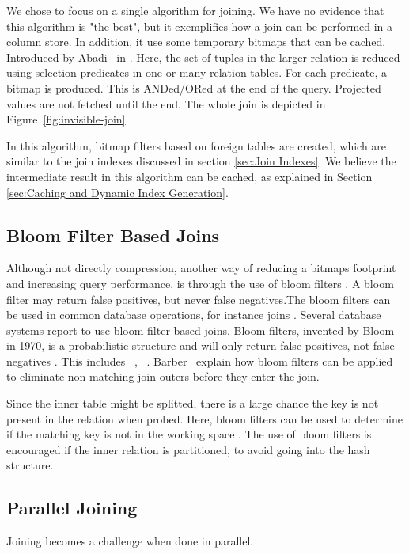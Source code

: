 We chose to focus on a single algorithm for joining. We have no evidence that this algorithm is "the best", but it exemplifies how a join can be performed in a column store. In addition, it use some temporary bitmaps that can be cached. Introduced by Abadi \ea~in  \cite{Abadi2008-dd}. Here, the set of tuples in the larger relation is reduced using selection predicates in one or many relation tables. For each predicate, a bitmap is produced. This is ANDed/ORed at the end of the query. Projected values are not fetched until the end. The whole join is depicted in Figure~\ref{fig:invisible-join}.

In this algorithm, bitmap filters based on foreign tables are created, which are similar to the join indexes discussed in section \ref{sec:Join Indexes}. We believe the intermediate result in this algorithm can be cached, as explained in Section \ref{sec:Caching and Dynamic Index Generation}.

\subsection{Bloom Filter Based Joins}
\label{sub:Bloom Filter Based Joins}
Although not directly compression, another way of reducing a bitmaps footprint and increasing query performance, is through the use of bloom filters \cite{Bloom1970-nr}. A bloom filter may return false positives, but never false negatives.The bloom filters can be used in common database operations, for instance joins \cite{x} . Several database systems report to use bloom filter based joins. Bloom filters, invented by Bloom in 1970, is a probabilistic structure and will only return false positives, not false negatives \cite{Bloom1970-nr}. This includes \oracle~\cite{Lahiri2015-mz}, \ibm~\cite{Raman2013-em}. Barber \ea~explain how bloom filters can be applied to eliminate non-matching join outers before they enter the join.

Since the inner table might be splitted, there is a large chance the key is not present in the relation when probed. Here, bloom filters can be used to determine if the matching key is not in the working space \cite{Bratbergsengen2015}. The use of bloom filters is encouraged if the inner relation is partitioned, to avoid going into the hash structure.

\subsection{Parallel Joining}
\label{sub:Parallel Joining}
Joining becomes a challenge when done in parallel.

